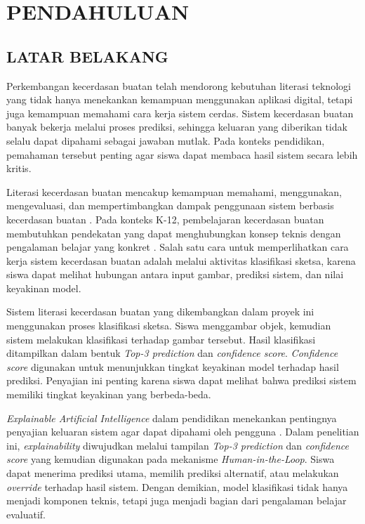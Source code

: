\documentclass[12pt,a4paper,oneside,openany]{report}
\begin{document}
\chapter{PENDAHULUAN}
\label{chap:bab1}

\section{LATAR BELAKANG}
\label{sec:latar-belakang}

Perkembangan kecerdasan buatan telah mendorong kebutuhan literasi teknologi yang tidak hanya menekankan kemampuan menggunakan aplikasi digital, tetapi juga kemampuan memahami cara kerja sistem cerdas. Sistem kecerdasan buatan banyak bekerja melalui proses prediksi, sehingga keluaran yang diberikan tidak selalu dapat dipahami sebagai jawaban mutlak. Pada konteks pendidikan, pemahaman tersebut penting agar siswa dapat membaca hasil sistem secara lebih kritis.

Literasi kecerdasan buatan mencakup kemampuan memahami, menggunakan, mengevaluasi, dan mempertimbangkan dampak penggunaan sistem berbasis kecerdasan buatan \cite{ref1}. Pada konteks K-12, pembelajaran kecerdasan buatan membutuhkan pendekatan yang dapat menghubungkan konsep teknis dengan pengalaman belajar yang konkret \cite{ref2}. Salah satu cara untuk memperlihatkan cara kerja sistem kecerdasan buatan adalah melalui aktivitas klasifikasi sketsa, karena siswa dapat melihat hubungan antara input gambar, prediksi sistem, dan nilai keyakinan model.

Sistem literasi kecerdasan buatan yang dikembangkan dalam proyek ini menggunakan proses klasifikasi sketsa. Siswa menggambar objek, kemudian sistem melakukan klasifikasi terhadap gambar tersebut. Hasil klasifikasi ditampilkan dalam bentuk \textit{Top-3 prediction} dan \textit{confidence score}. \textit{Confidence score} digunakan untuk menunjukkan tingkat keyakinan model terhadap hasil prediksi. Penyajian ini penting karena siswa dapat melihat bahwa prediksi sistem memiliki tingkat keyakinan yang berbeda-beda.

\textit{Explainable Artificial Intelligence} dalam pendidikan menekankan pentingnya penyajian keluaran sistem agar dapat dipahami oleh pengguna \cite{ref3}. Dalam penelitian ini, \textit{explainability} diwujudkan melalui tampilan \textit{Top-3 prediction} dan \textit{confidence score} yang kemudian digunakan pada mekanisme \textit{Human-in-the-Loop}. Siswa dapat menerima prediksi utama, memilih prediksi alternatif, atau melakukan \textit{override} terhadap hasil sistem. Dengan demikian, model klasifikasi tidak hanya menjadi komponen teknis, tetapi juga menjadi bagian dari pengalaman belajar evaluatif.
\end{document}
